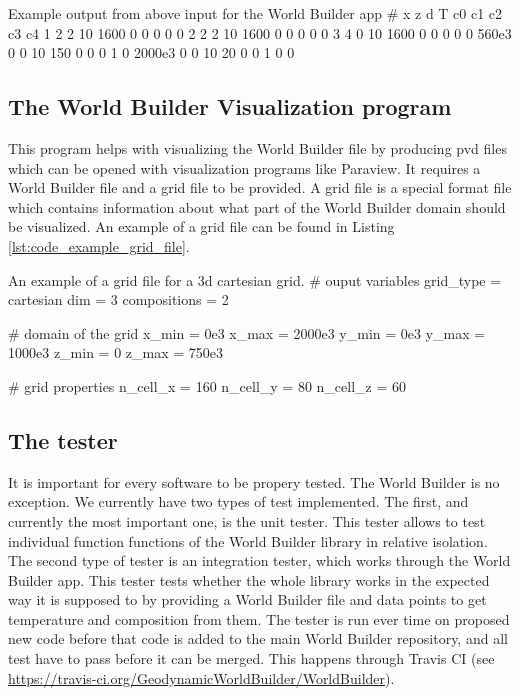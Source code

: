 \documentclass{book}
\newcommand{\WB}{{World Builder}}
\newcommand{\paraview}{{Paraview}}
\begin{document}
\begin{bashcode}[label={lst:code_example_app_out}]{Example output from above input for the \WB{} app}
# x z d T c0 c1 c2 c3 c4 
1 2 2 10 1600 0 0 0 0 0 
2 2 2 10 1600 0 0 0 0 0 
3 4 0 10 1600 0 0 0 0 0 
560e3 0 0 10 150 0 0 0 1 0 
2000e3 0 0 10 20 0 0 1 0 0
\end{bashcode}

\subsection{The World Builder Visualization program}
This program helps with visualizing the \WB{} file by producing pvd files which can be opened with visualization programs like \paraview{}. It requires a \WB{} file and a grid file to be provided. A grid file is a special format file which contains information about what part of the \WB{} domain should be visualized. An example of a grid file can be found in Listing \ref{lst:code_example_grid_file}.

\begin{bashcode}[label={lst:code_example_grid_file}]{An example of a grid file for a 3d cartesian grid.}
# ouput variables
grid_type = cartesian
dim = 3
compositions = 2

# domain of the grid
x_min = 0e3
x_max = 2000e3
y_min = 0e3
y_max = 1000e3
z_min = 0 
z_max = 750e3

# grid properties
n_cell_x = 160
n_cell_y = 80
n_cell_z = 60
\end{bashcode}

\subsection{The tester}
It is important for every software to be propery tested. The \WB{} is no exception. We currently have two types of test implemented. The first, and currently the most important one, is the unit tester. This tester allows to test individual function functions of the \WB{} library in relative isolation. The second type of tester is an integration tester, which works through the \WB{} app. This tester tests whether the whole library works in the expected way it is supposed to by providing a \WB{} file and data points to get temperature and composition from them. The tester is run ever time on proposed new code before that code is added to the main \WB{} repository, and all test have to pass before it can be merged. This happens through Travis CI (see \url{https://travis-ci.org/GeodynamicWorldBuilder/WorldBuilder}).
\end{document}
